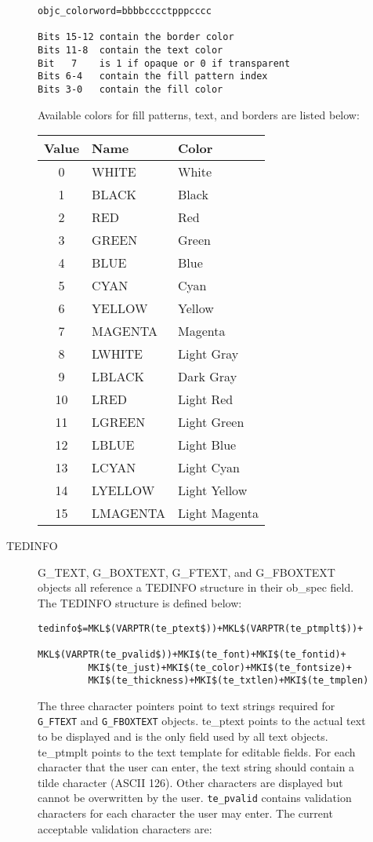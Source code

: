 \begin{description}
\begin{description}
\begin{verbatim}
objc_colorword=bbbbcccctpppcccc

Bits 15-12 contain the border color 
Bits 11-8  contain the text color 
Bit   7    is 1 if opaque or 0 if transparent 
Bits 6-4   contain the fill pattern index 
Bits 3-0   contain the fill color 
\end{verbatim}

Available colors for fill patterns, text, and borders are listed
below:
\begin{center}
\begin{tabular}{|cll|}
\hline
{\bf Value} &{\bf  Name}&{\bf  Color}  \\
\hline
 0&  WHITE	&  White\\
 1&  BLACK	&  Black\\
 2&  RED	&  Red\\
 3&  GREEN	&  Green\\
 4&  BLUE	&  Blue\\
 5&  CYAN	&  Cyan\\
 6&  YELLOW	&  Yellow\\
 7&  MAGENTA	&  Magenta\\
 8&  LWHITE	&  Light Gray\\
 9&  LBLACK	&  Dark Gray\\
 10& LRED	&  Light Red\\
 11& LGREEN	&  Light Green\\
 12& LBLUE	&  Light Blue\\
 13& LCYAN	&  Light Cyan\\
 14& LYELLOW	&  Light Yellow\\
 15& LMAGENTA	&  Light Magenta\\
\hline
\end{tabular}
\end{center}


\item[TEDINFO]
G\_TEXT, G\_BOXTEXT, G\_FTEXT, and G\_FBOXTEXT objects all reference a
TEDINFO structure in their ob\_spec field. The TEDINFO structure is
defined below:
 {\footnotesize
\begin{verbatim}                                                         
tedinfo$=MKL$(VARPTR(te_ptext$))+MKL$(VARPTR(te_ptmplt$))+
         MKL$(VARPTR(te_pvalid$))+MKI$(te_font)+MKI$(te_fontid)+
         MKI$(te_just)+MKI$(te_color)+MKI$(te_fontsize)+
         MKI$(te_thickness)+MKI$(te_txtlen)+MKI$(te_tmplen)
\end{verbatim}}

The three character pointers point to text strings required for 
\verb|G_FTEXT|
and \verb|G_FBOXTEXT| objects. te\_ptext points to the actual text to be
displayed and is the only field used by all text objects. te\_ptmplt
points to the text template for editable fields. For each character
that the user can enter, the text string should contain a tilde
character (ASCII 126). Other characters are displayed but cannot be
overwritten by the user. \verb|te_pvalid| contains validation characters for
each character the user may enter. The current acceptable validation
characters are:


\end{description}
\end{description}
